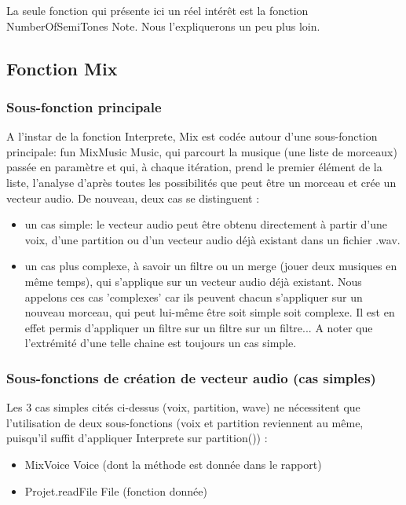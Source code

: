 \documentclass[12pt,a4paper]{article}
\begin{document}
La seule fonction qui présente ici un réel intérêt est la fonction {NumberOfSemiTones Note}. Nous l'expliquerons un peu plus loin.

\subsection{Fonction Mix}
\subsubsection{Sous-fonction principale}
A l'instar de la fonction Interprete, Mix est codée autour d'une sous-fonction principale: 
fun {MixMusic Music}, qui parcourt la musique (une liste de morceaux) passée en paramètre 
et qui, à chaque itération, prend le premier élément de la liste, l'analyse d'après toutes
 les possibilités que peut être un morceau et crée un vecteur audio. 
De nouveau, deux cas se distinguent :
\begin{itemize}
	\item un cas simple: le vecteur audio peut être obtenu directement à partir d'une voix, 
				d'une partition ou d'un vecteur audio déjà existant dans un fichier .wav.
	\item un cas plus complexe, à savoir un filtre ou un merge (jouer deux musiques en même temps),
				qui s'applique sur un vecteur audio déjà existant. Nous appelons ces cas 'complexes' car ils 
				peuvent chacun s'appliquer sur un nouveau morceau, qui peut lui-même être soit simple soit complexe.
				Il est en effet permis d'appliquer un filtre sur un filtre sur un filtre... A noter que l'extrémité 
				d'une telle chaine est toujours un cas simple.
\end{itemize}

\subsubsection{Sous-fonctions de création de vecteur audio (cas simples)}
Les 3 cas simples cités ci-dessus (voix, partition, wave)  ne nécessitent que l'utilisation
de deux sous-fonctions (voix et partition reviennent au même, puisqu'il suffit d'appliquer Interprete sur partition()) :
\begin{itemize}
	\item {MixVoice Voice} (dont la méthode est donnée dans le rapport)
	\item {Projet.readFile File} (fonction donnée)
\end{itemize}
\end{document}
